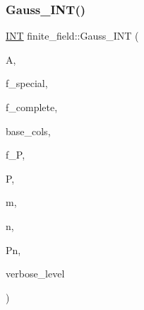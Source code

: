\mbox{\label{classfinite__field_adb676d2e80341b53751326e3a58beb11}} 
\subsubsection{\texorpdfstring{Gauss\+\_\+\+I\+N\+T()}{Gauss\_INT()}}
{\footnotesize\ttfamily \mbox{\hyperlink{galois_8h_a09fddde158a3a20bd2dcadb609de11dc}{I\+NT}} finite\+\_\+field\+::\+Gauss\+\_\+\+I\+NT (\begin{DoxyParamCaption}\item[{\mbox{\hyperlink{galois_8h_a09fddde158a3a20bd2dcadb609de11dc}{I\+NT}} $\ast$}]{A,  }\item[{\mbox{\hyperlink{galois_8h_a09fddde158a3a20bd2dcadb609de11dc}{I\+NT}}}]{f\+\_\+special,  }\item[{\mbox{\hyperlink{galois_8h_a09fddde158a3a20bd2dcadb609de11dc}{I\+NT}}}]{f\+\_\+complete,  }\item[{\mbox{\hyperlink{galois_8h_a09fddde158a3a20bd2dcadb609de11dc}{I\+NT}} $\ast$}]{base\+\_\+cols,  }\item[{\mbox{\hyperlink{galois_8h_a09fddde158a3a20bd2dcadb609de11dc}{I\+NT}}}]{f\+\_\+P,  }\item[{\mbox{\hyperlink{galois_8h_a09fddde158a3a20bd2dcadb609de11dc}{I\+NT}} $\ast$}]{P,  }\item[{\mbox{\hyperlink{galois_8h_a09fddde158a3a20bd2dcadb609de11dc}{I\+NT}}}]{m,  }\item[{\mbox{\hyperlink{galois_8h_a09fddde158a3a20bd2dcadb609de11dc}{I\+NT}}}]{n,  }\item[{\mbox{\hyperlink{galois_8h_a09fddde158a3a20bd2dcadb609de11dc}{I\+NT}}}]{Pn,  }\item[{\mbox{\hyperlink{galois_8h_a09fddde158a3a20bd2dcadb609de11dc}{I\+NT}}}]{verbose\+\_\+level }\end{DoxyParamCaption})}

\mbox{\label{classfinite__field_a4189c0ddba7c456ea23d8004fef59be0}} 
